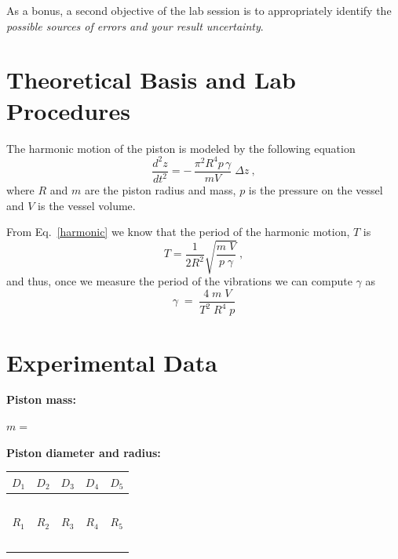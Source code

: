 \documentclass{article}
\begin{document}
As a bonus, a second objective of the lab session is to appropriately identify the
\textit{possible sources of errors and your result uncertainty}. 


\section{Theoretical Basis and Lab Procedures}
The harmonic motion of the piston is modeled by the following equation
\begin{equation}
\frac{d^2 z}{d t^2} =  - \, \frac{\pi^2 R^4 p \, \gamma}{m  V} \;
\Delta z~,
\label{harmonic}
\end{equation}
\noindent where $R$ and $m$ are the piston radius and mass, $p$ is the
pressure on the vessel and $V$ is the vessel volume.

From Eq.~\eqref{harmonic} we know that the period of the harmonic
motion, $T$ is
\begin{equation}
T = \frac{1}{2 R^2} \sqrt{\frac{m \; V}{p \; \gamma}}~,
\end{equation}
\noindent and thus, once we measure the period of the vibrations we
can compute $\gamma$ as
{\large
\begin{equation}
\gamma \; = \; \frac{4 \; m \; V}{T^2 \; R^4 \; p}
\end{equation}
}


\section{Experimental Data}


\textbf{Piston mass:}

\vspace{5mm}

$m = $ \underline{\hspace{4cm}}

\vspace{5mm}


\textbf{Piston diameter and radius:}

\vspace{5mm}

\begin{tabular}{|c|c|c|c|c|}
\hline
$D_1$&$D_2$&$D_3$&$D_4$&$D_5$\\
\hline
~\hspace{3cm}~&~\hspace{3cm}~&~\hspace{3cm}~&\hspace{3cm}~&~\hspace{3cm}~\\
\hline
$R_1$&$R_2$&$R_3$&$R_4$&$R_5$\\
\hline
\hspace{3cm}~&~\hspace{3cm}~&~\hspace{3cm}~&~\hspace{3cm}~&~\hspace{3cm}~\\
\hline
\end{tabular}
\end{document}
